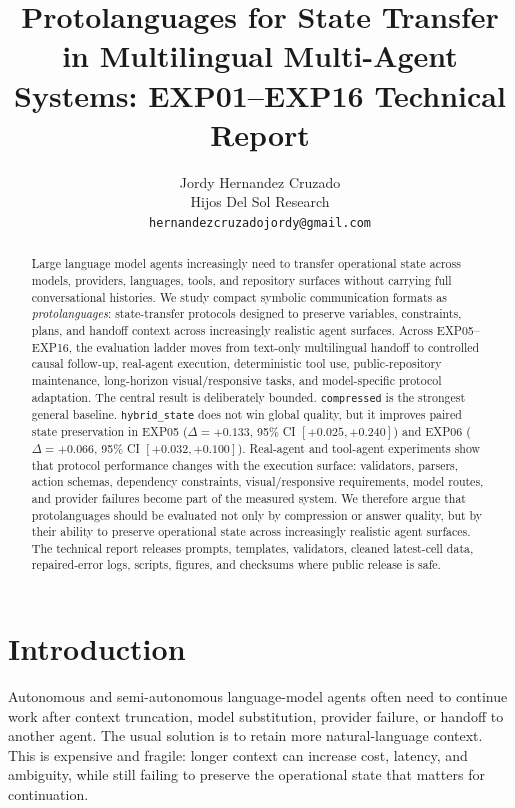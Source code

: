 \documentclass[11pt]{article}
\title{Protolanguages for State Transfer in Multilingual Multi-Agent Systems: EXP01--EXP16 Technical Report}
\author{Jordy Hernandez Cruzado\\Hijos Del Sol Research\\\texttt{hernandezcruzadojordy@gmail.com}}
\date{}
\begin{document}
\maketitle

\begin{abstract}
Large language model agents increasingly need to transfer operational state across models, providers, languages, tools, and repository surfaces without carrying full conversational histories. We study compact symbolic communication formats as \emph{protolanguages}: state-transfer protocols designed to preserve variables, constraints, plans, and handoff context across increasingly realistic agent surfaces. Across EXP05--EXP16, the evaluation ladder moves from text-only multilingual handoff to controlled causal follow-up, real-agent execution, deterministic tool use, public-repository maintenance, long-horizon visual/responsive tasks, and model-specific protocol adaptation. The central result is deliberately bounded. \texttt{compressed} is the strongest general baseline. \texttt{hybrid\_state} does not win global quality, but it improves paired state preservation in EXP05 ($\Delta=+0.133$, 95\% CI $[+0.025,+0.240]$) and EXP06 ($\Delta=+0.066$, 95\% CI $[+0.032,+0.100]$). Real-agent and tool-agent experiments show that protocol performance changes with the execution surface: validators, parsers, action schemas, dependency constraints, visual/responsive requirements, model routes, and provider failures become part of the measured system. We therefore argue that protolanguages should be evaluated not only by compression or answer quality, but by their ability to preserve operational state across increasingly realistic agent surfaces. The technical report releases prompts, templates, validators, cleaned latest-cell data, repaired-error logs, scripts, figures, and checksums where public release is safe.
\end{abstract}

\section{Introduction}
Autonomous and semi-autonomous language-model agents often need to continue work after context truncation, model substitution, provider failure, or handoff to another agent. The usual solution is to retain more natural-language context. This is expensive and fragile: longer context can increase cost, latency, and ambiguity, while still failing to preserve the operational state that matters for continuation.
\end{document}
